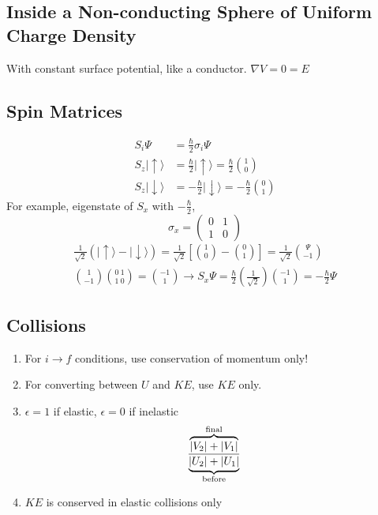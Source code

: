 \documentclass[10pt,letter]{article}
\begin{document}
\subsection{Inside a Non-conducting Sphere of Uniform Charge Density}
With constant surface potential, like a conductor. $\nabla V = 0 = E$

\subsection{Spin Matrices}
\begin{align}
S_i\Psi &= \frac{\hbar}{2}\sigma_i\Psi\\
S_z | \uparrow \rangle &= \frac{\hbar}{2} | \uparrow \rangle = \frac{\hbar}{2} \binom{1}{0}\\
S_z | \downarrow \rangle &= -\frac{\hbar}{2} | \downarrow \rangle = -\frac{\hbar}{2} \binom{0}{1}
\end{align}
For example, eigenstate of $S_x$ with $-\frac{\hbar}{2}$, 
\[ \sigma_x = \left( \begin{array}{cc}
0 & 1  \\
1 & 0  \end{array} \right)\]
\begin{align}
  \frac{1}{\sqrt{2}}(| \uparrow \rangle - | \downarrow \rangle) = \frac{1}{\sqrt{2}} \left[ \binom{1}{0} - \binom{0}{1}\right] = \frac{1}{\sqrt{2}} \binom{\Psi}{-1}\\
  \binom{1}{-1} \binom{0~1}{1~0} = \binom{-1}{1} \rightarrow S_x\Psi = \frac{\hbar}{2} \left( \frac{1}{\sqrt{2}}\right) \binom{-1}{1} = -\frac{\hbar}{2}\Psi
\end{align}

\subsection{Collisions}
\begin{enumerate}
    \item For $i \rightarrow f$ conditions, use conservation of momentum only!
    \item For converting between $U$ and $KE$, use $KE$ only.
    \item $\epsilon = 1$ if elastic, $\epsilon = 0$ if inelastic\\
    \begin{equation}
        \frac{\overbrace{|V_2| + |V_1|}^{ \mathclap{\textrm{final}}} } {\underbrace{|U_2| + |U_1|}_{ \mathclap{\textrm{before}} }}
    \end{equation}
    \item $KE$ is conserved in elastic collisions only
\end{enumerate}
\end{document}
